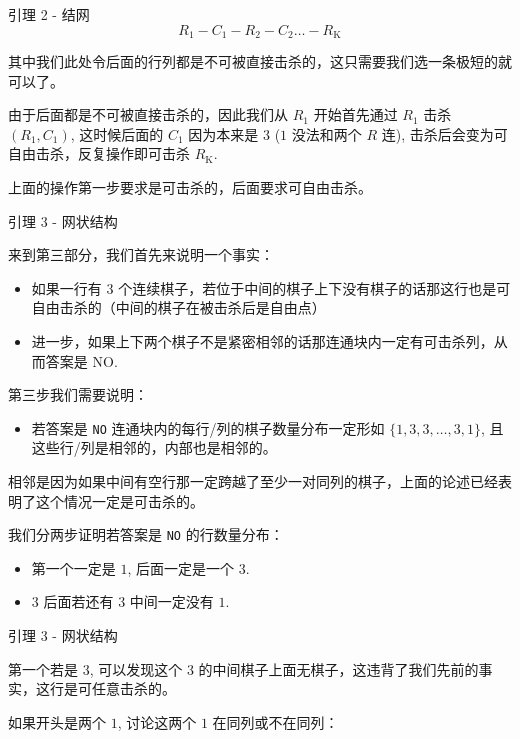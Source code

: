 \documentclass{beamer}
\newcommand{\TT}[1] {{\ttfamily #1}}
\begin{document}
{\begin{frame}{引理 2 - 结网}
\[
  R_1 - C_1 - R_2 - C_2 \ldots - R_{\text{K}}
\]

其中我们此处令后面的行列都是不可被直接击杀的，这只需要我们选一条极短的就可以了。

由于后面都是不可被直接击杀的，因此我们从 $R_1$ 开始首先通过 $R_1$ 击杀 $(R_1, C_1)$, 这时候后面的 $C_1$ 因为本来是 $3$ ($1$ 没法和两个 $R$ 连), 击杀后会变为可自由击杀，反复操作即可击杀 $R_\text{K}$.

上面的操作第一步要求是可击杀的，后面要求可自由击杀。


\end{frame}


\begin{frame}{引理 3 - 网状结构}
  
来到第三部分，我们首先来说明一个事实：

\begin{itemize}
  \item 如果一行有 $3$ 个连续棋子，若位于中间的棋子上下没有棋子的话那这行也是可自由击杀的（中间的棋子在被击杀后是自由点）
  \item 进一步，如果上下两个棋子不是紧密相邻的话那连通块内一定有可击杀列，从而答案是 \TT{NO}.
\end{itemize}

第三步我们需要说明：

\begin{itemize}
  \item 若答案是 \texttt{NO} 连通块内的每行/列的棋子数量分布一定形如 $\{1, 3, 3, \ldots, 3, 1\}$, 且这些行/列是相邻的，内部也是相邻的。
\end{itemize}

相邻是因为如果中间有空行那一定跨越了至少一对同列的棋子，上面的论述已经表明了这个情况一定是可击杀的。

我们分两步证明若答案是 \texttt{NO} 的行数量分布：

\begin{itemize}
  \item 第一个一定是 $1$, 后面一定是一个 $3$.
  \item $3$ 后面若还有 $3$ 中间一定没有 $1$.
\end{itemize}

\end{frame}


\begin{frame}{引理 3 - 网状结构}
  
第一个若是 $3$, 可以发现这个 $3$ 的中间棋子上面无棋子，这违背了我们先前的事实，这行是可任意击杀的。

如果开头是两个 $1$, 讨论这两个 $1$ 在同列或不在同列：


\end{frame}}
\end{document}
